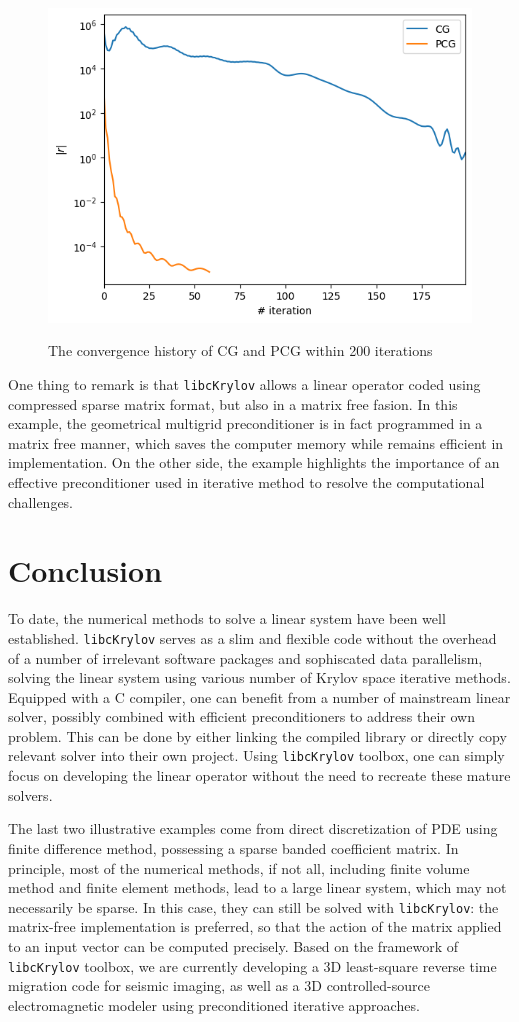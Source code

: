 \documentclass[10pt]{article}
\begin{document}
\begin{figure}
  \centering
  \includegraphics[width=0.7\linewidth]{cg_pcg.png}\label{fig:cgpcg}
  \caption{The convergence history of CG and PCG within 200 iterations}
\end{figure}

One thing to remark is that \verb|libcKrylov| allows a linear operator coded using compressed sparse matrix format, but also in a matrix free fasion. In this example, the geometrical multigrid preconditioner is in fact programmed in a matrix free manner, which saves the computer memory while remains efficient in implementation. On the other side, the example highlights the importance of an effective preconditioner used in iterative method to resolve the computational challenges.

\section{Conclusion}

To date, the numerical methods to solve a linear system have been well established. \verb|libcKrylov| serves as a slim and flexible code without the overhead of a number of irrelevant software packages and sophiscated data parallelism, solving the linear system using various number of Krylov space iterative methods.  Equipped with a C compiler, one can benefit from a number of mainstream linear solver, possibly combined with efficient preconditioners to address their own problem. This can be done by either linking the compiled library or directly copy relevant solver into their own project. Using \verb|libcKrylov| toolbox, one can simply focus on developing the linear operator without the need to recreate these mature solvers. 

The last two illustrative examples come from direct discretization of PDE using finite difference method, possessing a sparse banded coefficient matrix. In principle, most of the numerical methods, if not all, including finite volume method and finite element methods, lead to a large linear system, which may not necessarily be  sparse. In this case, they can still be solved with \verb|libcKrylov|: the matrix-free implementation is preferred, so that the action of the matrix applied to an input vector can be computed precisely. Based on the framework of \verb|libcKrylov| toolbox, we are currently developing a 3D least-square reverse time migration code for seismic imaging, as well as a 3D controlled-source electromagnetic modeler using preconditioned iterative approaches.
\end{document}
